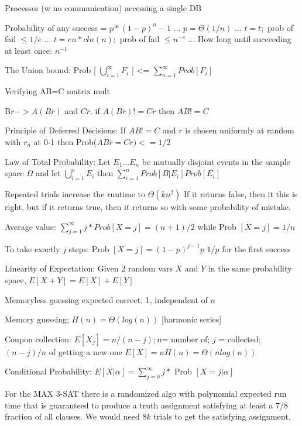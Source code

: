 
Processes (w no communication) accessing a single DB

Probability of any success =  $p* (1 - p) ^ n-1 $ ...
$p = \Theta(1/n)$ ...
$t = t;$ prob of fail $\leq 1/e$ ...
$t = en*cln(n);$ prob of fail $\leq n^{-c}$ ...
How long until succeeding at least once: $n^{-1}$

The Union bound: Prob [ $\bigcup\limits_{i=1}^{\infty} F_{i}$ ] <= $\sum_{n=1}^{\infty}  Prob[ F_{i}] $ 


Verifying AB=C matrix mult

B$\overbar{r} -> A(B\overbar{r})$ and $C\overbar{r}$. if $A(B\overbar{r}) != C\overbar{r}$ then $AB != C$

Principle of Deferred Decisions: If $AB != C$ and $\overbar{r}$ is chosen uniformly at random with $r_n$ at 0-1 then Prob($AB\overbar{r} = C\overbar{r}) <= 1/2$

Law of Total Probability: Let $E_1 ... E_n$ be mutually disjoint events in the sample space $\Omega$ and let $\bigcup\limits_{i=1}^{n} E_{i}$ then $\sum_{i=1}^{n}  Prob[ B | E_{i}] Prob[E_{i}] $ 

Repeated trials increase the runtime to $\Theta(kn^2)$
If it returns false, then it this is right, but if it returns true, then it returns so with some probability of mistake.


Average value: $\sum_{j=1}^{\infty}  j * Prob[ X = j ]  = (n + 1) / 2$ while Prob $[X = j] = 1/n$

To take exactly $j$ steps: Prob $[X = j] = (1 - p)^{j - 1} p$
$1/p$ for the first success

Linearity of Expectation: Given 2 random vars $X$ and $Y$ in the same probability space, $E [X + Y] = E[ X ] + E [ Y ] $

Memoryless guessing expected correct: 1, independent of $n$

Memory guessing; $H(n) = \Theta(log(n))$ [harmonic series]

Coupon collection: $E[ X_{j}] = n / (n - j); n $= number of; $j$ = collected; $( n - j ) / n$ of getting a new one
$E[X] = nH(n) = \Theta(nlog(n))$

Conditional Probability: $E[ X | \alpha ] =  \sum_{j=0}^{\infty} j *$ Prob $[ X = j | \alpha]$

For the MAX 3-SAT there is a randomized algo with polynomial expected run time that is guaranteed to produce a truth assignment satisfying at least a $7/8$ fraction of all clauses. We would need $8k$ trials to get the satisfying assignment.

